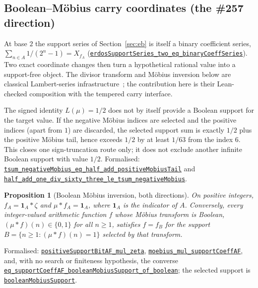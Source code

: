 \documentclass[11pt]{article}
\newcommand{\commit}{81150c1c6fdd4cd51e76d3aa0de344341e0e9e7c}
\newcommand{\repobase}{https://github.com/wcook04/plectis-lean-erdos249-257/blob/\commit}
\newcommand{\PK}{Erdos249257}
\newcommand{\lref}[3]{\href{\repobase/\PK/#1\#L#2}{\nolinkurl{#3}}}
\newcommand{\lrefx}[3]{\href{\repobase/\PK/#1\#L#2}{\nolinkurl{#3}}}
\newtheorem{proposition}[theorem]{Proposition}
\theoremstyle{definition}
\theoremstyle{remark}
\begin{document}
\subsection{Boolean--M\"obius carry coordinates (the \#257 direction)}

At base $2$ the support series of Section~\ref{sec:eb} is itself a binary
coefficient series, $\sum_{n\in A}1/(2^n-1)=X_{f_A}$
(\lrefx{BooleanMobiusCarry.lean}{376}{erdosSupportSeries_two_eq_binaryCoeffSeries}).
Two exact coordinate changes then turn a hypothetical rational value into a
support-free object. The divisor transform and M\"obius inversion below are
classical Lambert-series infrastructure~\cite{apostol,merca2017,mercaschmidt}; the
contribution here is their Lean-checked composition with the tempered carry
interface.

The signed identity $L(\mu)=1/2$ does not by itself provide a Boolean support
for the target value.  If the negative M\"obius indices are selected and the
positive indices (apart from $1$) are discarded, the selected support sum is
exactly $1/2$ plus the positive M\"obius tail, hence exceeds $1/2$ by at least
$1/63$ from the index $6$.  This closes one sign-truncation route only; it does
not exclude another infinite Boolean support with value $1/2$.
\noindent Formalised:
\lref{MobiusSignSupportNoGo.lean}{111}{tsum_negativeMobius_eq_half_add_positiveMobiusTail}
and
\lref{MobiusSignSupportNoGo.lean}{150}{half_add_one_div_sixty_three_le_tsum_negativeMobius}.

\begin{proposition}[Boolean M\"obius inversion, both directions]\label{res:boolmob}
On positive integers, $f_A=\mathbf 1_A*\zeta$ and $\mu*f_A=\mathbf 1_A$, where
$\mathbf 1_A$ is the indicator of $A$. Conversely, every integer-valued
arithmetic function $f$ whose M\"obius transform is Boolean,
$(\mu*f)(n)\in\{0,1\}$ for all $n\ge1$, satisfies $f=f_B$ for the support
$B=\{n\ge1:(\mu*f)(n)=1\}$ selected by that transform.
\end{proposition}
\noindent Formalised:
\lref{BooleanMobiusCarry.lean}{76}{positiveSupportBitAF_mul_zeta},
\lref{BooleanMobiusCarry.lean}{94}{moebius_mul_supportCoeffAF}, and, with no
search or finiteness hypothesis, the converse
\lref{BooleanMobiusCarry.lean}{180}{eq_supportCoeffAF_booleanMobiusSupport_of_boolean};
the selected support is
\lrefx{BooleanMobiusCarry.lean}{139}{booleanMobiusSupport}.
\end{document}
